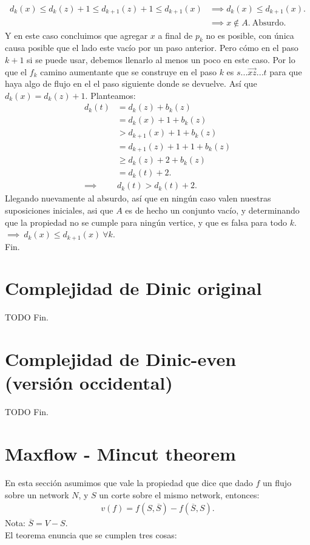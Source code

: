 \documentclass{article}
\begin{document}
\begin{equation}
	\begin{aligned}
		d_k(x) \leq d_k(z) + 1 \leq d_{k+1}(z) + 1 \leq d_{k+1}(x)
		&\implies d_k(x) \leq d_{k+1}(x).\\
		&\implies x \notin A.\ \text{Absurdo.}
	\end{aligned}
\end{equation}
Y en este caso concluimos que agregar $x$ a final de $p_k$ no es posible, con única causa posible
que el lado este vacío por un paso anterior. Pero cómo en el paso $k+1$ si se puede usar, debemos
llenarlo al menos un poco en este caso.
Por lo que el $f_k$ camino aumentante que se construye en el paso $k$ es
$s...\overrightarrow{xz}...t$ 
para que haya algo de flujo en el el paso siguiente donde se devuelve.
Así que $d_k(x) = d_k(z) + 1$. Planteamos:
\begin{equation}
	\begin{aligned}
		d_k(t) &= d_k(z) + b_k(z)\\
		       &= d_k(x) + 1 + b_k(z)\\
		       &> d_{k+1}(x) + 1 + b_k(z)\\
		       &= d_{k+1}(z) + 1 + 1 + b_k(z)\\
		       &\geq d_k(z) + 2 + b_k(z)\\
		       &= d_k(t)  + 2.\\
		\implies& d_k(t) > d_k(t) + 2.
	\end{aligned}
\end{equation}
Llegando nuevamente al absurdo, así que en ningún caso valen nuestras suposiciones iniciales, asi
que $A$ es de hecho un conjunto vacío, y determinando que la propiedad no se cumple para ningún
vertice, y que es falsa para todo $k$. $\implies \ d_k(x) \leq d_{k+1}(x) \ \forall k$.\\

Fin.

\section{Complejidad de Dinic original}
TODO
Fin.
\section{Complejidad de Dinic-even (versión occidental)}
TODO
Fin.

\section{Maxflow - Mincut theorem}
En esta sección asumimos que vale la propiedad que dice que dado $f$ un flujo sobre un network
$N$, y  $S$ un corte sobre el mismo network, entonces:
\begin{equation}
	\begin{aligned}
		v(f) = f(S,\overline{S}) - f(\overline{S},S).
	\end{aligned}
\end{equation}
Nota: $\overline{S} = V-S$.\\
El teorema enuncia que se cumplen tres cosas:\\
\end{document}
